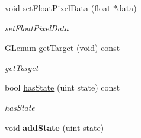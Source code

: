 \begin{DoxyCompactItemize}
void \hyperlink{classEngine_1_1Texture_acf386fc4ead9d178e3c433c01f888c7d}{set\+Float\+Pixel\+Data} (float $\ast$data)
\begin{DoxyCompactList}\small\item\em set\+Float\+Pixel\+Data \end{DoxyCompactList}\item 
G\+Lenum \hyperlink{classEngine_1_1Texture_a263bb4f34e2457707111a4b87d9dfc0a}{get\+Target} (void) const 
\begin{DoxyCompactList}\small\item\em get\+Target \end{DoxyCompactList}\item 
bool \hyperlink{classEngine_1_1Texture_a67cc53240823f5bdd79d3dbbe3fd5af2}{has\+State} (uint state) const 
\begin{DoxyCompactList}\small\item\em has\+State \end{DoxyCompactList}\item 
\hypertarget{classEngine_1_1Texture_a7c0151dc9ccbc2d355acc76ec887dd0f}{}void {\bfseries add\+State} (uint state)\label{classEngine_1_1Texture_a7c0151dc9ccbc2d355acc76ec887dd0f}


\end{DoxyCompactItemize}
